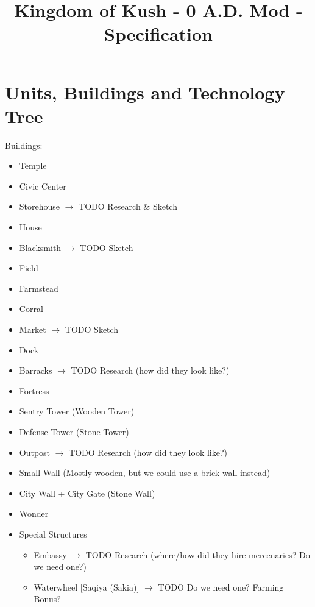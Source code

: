 \documentclass[a4paper,12pt]{scrreprt}
\title{Kingdom of Kush - 0 A.D. Mod - Specification}
\begin{document}
\maketitle


\tableofcontents

\chapter{Units, Buildings and Technology Tree}

Buildings:

\begin{itemize}
	\item Temple
	\item Civic Center
	\item Storehouse $\rightarrow$ TODO Research \& Sketch
	\item House
	\item Blacksmith $\rightarrow$ TODO Sketch
	\item Field
	\item Farmstead
	\item Corral
	\item Market $\rightarrow$ TODO Sketch
	\item Dock
	\item Barracks $\rightarrow$ TODO Research (how did they look like?)
	\item Fortress
	\item Sentry Tower (Wooden Tower)
	\item Defense Tower (Stone Tower)
	\item Outpost $\rightarrow$ TODO Research (how did they look like?)
	\item Small Wall (Mostly wooden, but we could use a brick wall instead)
	\item City Wall + City Gate (Stone Wall)
	\item Wonder
	\item Special Structures
	\begin{itemize}
		\item Embassy $\rightarrow$ TODO Research (where/how did they hire mercenaries? Do we need one?)
		\item Waterwheel [Saqiya (Sakia)] $\rightarrow$ TODO Do we need one? Farming Bonus?
	\end{itemize}
\end{itemize}
\end{document}
